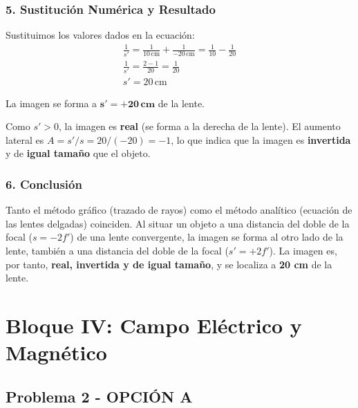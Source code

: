\subsubsection*{5. Sustitución Numérica y Resultado}
Sustituimos los valores dados en la ecuación:
\begin{gather}
    \frac{1}{s'} = \frac{1}{10 \, \text{cm}} + \frac{1}{-20 \, \text{cm}} = \frac{1}{10} - \frac{1}{20} \nonumber \\[8pt]
    \frac{1}{s'} = \frac{2 - 1}{20} = \frac{1}{20} \nonumber \\[8pt]
    s' = 20 \, \text{cm}
\end{gather}
\begin{cajaresultado}
    La imagen se forma a $\boldsymbol{s' = +20 \, \textbf{cm}}$ de la lente.
\end{cajaresultado}
Como $s' > 0$, la imagen es \textbf{real} (se forma a la derecha de la lente). El aumento lateral es $A = s'/s = 20/(-20) = -1$, lo que indica que la imagen es \textbf{invertida} y de \textbf{igual tamaño} que el objeto.

\subsubsection*{6. Conclusión}
\begin{cajaconclusion}
    Tanto el método gráfico (trazado de rayos) como el método analítico (ecuación de las lentes delgadas) coinciden. Al situar un objeto a una distancia del doble de la focal ($s=-2f'$) de una lente convergente, la imagen se forma al otro lado de la lente, también a una distancia del doble de la focal ($s'=+2f'$). La imagen es, por tanto, \textbf{real, invertida y de igual tamaño}, y se localiza a \textbf{20 cm} de la lente.
\end{cajaconclusion}

\newpage

\section{Bloque IV: Campo Eléctrico y Magnético}
\label{sec:em_2005_sep_cv}

\subsection{Problema 2 - OPCIÓN A}
\label{subsec:4A_2005_sep_cv}

